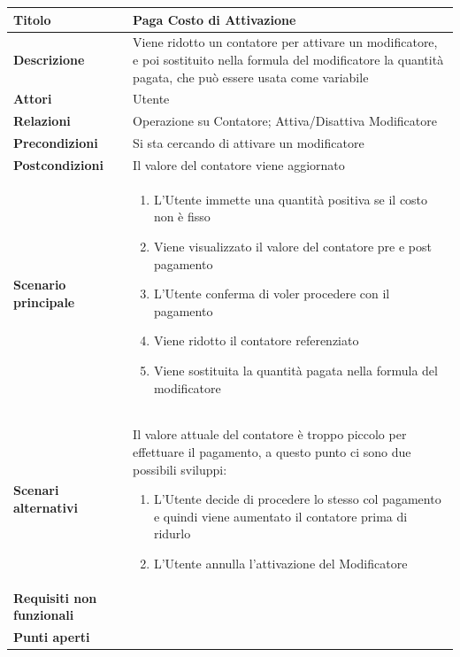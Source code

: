 \documentclass[a4paper, 11pt]{article}
\begin{document}
\begin{center}
\begin{tabular}{ |p{5cm}|p{9.5cm}|  }
\hline
\textbf{Titolo} & Paga Costo di Attivazione \\
\hline
\textbf{Descrizione} & Viene ridotto un contatore per attivare un modificatore, e poi sostituito nella formula del modificatore la quantità pagata, che può essere usata come variabile \\
\hline
\textbf{Attori} & Utente \\
\hline
\textbf{Relazioni} & Operazione su Contatore; Attiva/Disattiva Modificatore \\
\hline
\textbf{Precondizioni} & Si sta cercando di attivare un modificatore \\
\hline
\textbf{Postcondizioni} & Il valore del contatore viene aggiornato \\
\hline
\textbf{Scenario principale} & 
\begin{enumerate}
    \item L'Utente immette una quantità positiva se il costo non è fisso
    \item Viene visualizzato il valore del contatore pre e post pagamento
    \item L'Utente conferma di voler procedere con il pagamento
    \item Viene ridotto il contatore referenziato
    \item Viene sostituita la quantità pagata nella formula del modificatore
\end{enumerate}\\
\hline
\textbf{Scenari alternativi} & Il valore attuale del contatore è troppo piccolo per effettuare il pagamento, a questo punto ci sono due possibili sviluppi:
\begin{enumerate}
    \item L'Utente decide di procedere lo stesso col pagamento e quindi viene aumentato il contatore prima di ridurlo
    \item L'Utente annulla l'attivazione del Modificatore
\end{enumerate}\\
\hline
\textbf{Requisiti non funzionali} & \\
\hline
\textbf{Punti aperti} & \\
\hline
\end{tabular}

\vspace{3em}


\end{center}
\end{document}
